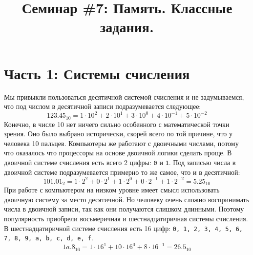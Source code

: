 \documentclass{article}
\begin{document}
\newpage

\title{Семинар \#7: Память. Классные задания.\vspace{-5ex}}\date{}\maketitle
\section*{Часть 1: Системы счисления}
Мы привыкли пользоваться десятичной системой счисления и не задумываемся, что под числом в десятичной записи подразумевается следующее:
$$
123.45_{10} = 1 \cdot 10^2 + 2 \cdot 10^1 + 3 \cdot 10^0 + 4 \cdot 10^{-1} + 5 \cdot 10^{-2}
$$
Конечно, в числе 10 нет ничего сильно особенного с математической точки зрения. Оно было выбрано исторически, скорей всего по той причине, что у человека 10 пальцев. Компьютеры же работают с двоичными числами, потому что оказалось что процессоры на основе двоичной логики сделать проще. В двоичной системе счисления есть всего 2 цифры: \texttt{0} и \texttt{1}. Под записью числа в двоичной системе подразумевается примерно то же самое, что и в десятичной:
$$
101.01_2 = 1 \cdot 2^2 + 0 \cdot 2^1 + 1 \cdot 2^0 + 0 \cdot 2^{-1} + 1 \cdot 2^{-2} = 5.25_{10}
$$
При работе с компьютером на низком уровне имеет смысл использовать двоичную систему за место десятичной.  Но человеку очень сложно воспринимать числа в двоичной записи, так как они получаются слишком длинными. Поэтому популярность приобрели восьмеричная и шестнадцатиричная системы счисления. В шестнадцатиричной системе счисления есть 16 цифр: \texttt{0, 1, 2, 3, 4, 5, 6, 7, 8, 9, a, b, c, d, e, f}.
$$
1a.8_{16} = 1 \cdot 16^1 + 10 \cdot 16^0 + 8 \cdot 16^{-1} = 26.5_{10}
$$
\end{document}
